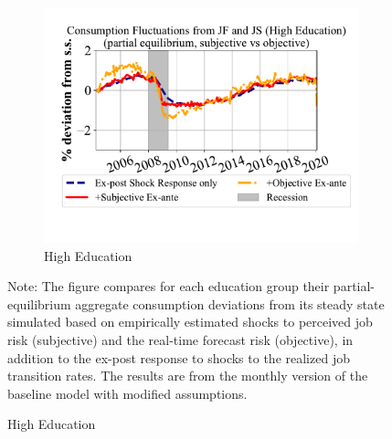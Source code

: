 \begin{figure}[ht]
\begin{subfigure}{0.32\linewidth}
    \end{subfigure}
    \hfill
    \begin{subfigure}{0.32\linewidth}
      \caption*{High Education}
        \includegraphics[width=\linewidth]{text/Chapter2/Figures/consumption_pe_JS_JF_deviation_machine_as_rational_HighEdu_monthly.pdf}
      
    \end{subfigure}

    \begin{flushleft}
        \footnotesize 
        Note: The figure compares for each education group their partial-equilibrium aggregate consumption deviations from its steady state simulated based on empirically estimated shocks to perceived job risk (subjective) and the real-time forecast risk (objective), in addition to the ex-post response to shocks to the realized job transition rates. The results are from the monthly version of the baseline model with modified assumptions.
    \end{flushleft}
\end{figure}